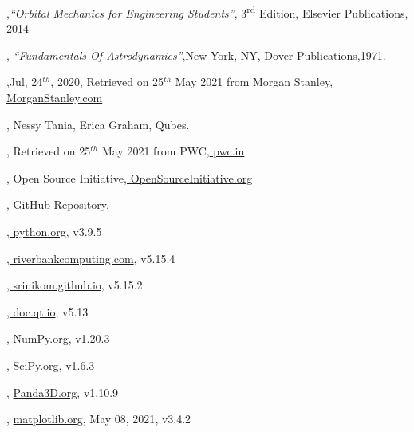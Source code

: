 \documentclass[12pt]{article}
\begin{document}
\begin{thebibliography}{99}
	,{\textit{\enquote{Orbital Mechanics for Engineering Students}}},{ 3\textsuperscript{rd} Edition}, { Elsevier Publications},{ 2014}	
	
	,{ \textit{\enquote{Fundamentals Of Astrodynamics}}},{New York, NY},{ Dover Publications},{1971}.
	
	,{Jul, 24$^{th}$, 2020}, { Retrieved on 25$^{th}$ May 2021 from Morgan Stanley},{\href{https://www.morganstanley.com/ideas/investing-in-space}{ MorganStanley.com}}
	
	,{ Nessy Tania, Erica Graham}, {Qubes.}
	
	,{ Retrieved on 25$^{th}$ May 2021 from PWC},{\href{https://www.pwc.in/research-insights/2020/preparing-to-scale-new-heights.html}{ pwc.in}}
	
	,{ Open Source Initiative},{\href{https://opensource.org/licenses/gpl-3.0.html}{ OpenSourceInitiative.org}}

	, {\href{https://github.com/iamlrk/MOPy}{GitHub Repository}}.
	
	,{\href{https://docs.python.org}{ python.org}},{ v3.9.5}
	
	,{\href{https://www.riverbankcomputing.com/static/Docs/PyQt5/}{ riverbankcomputing.com}},{ v5.15.4}
	
	,{\href{https://srinikom.github.io/pyside-docs/pysideapi2.html}{ srinikom.github.io}},{ v5.15.2}
	
	,{\href{https://doc.qt.io/qt-5/qtdesigner-manual.html}{ doc.qt.io}},{ v5.13}
	
	, {\href{https://numpy.org/doc}{ NumPy.org}},{ v1.20.3}
	
	, {\href{https://scipy.org/doc}{ SciPy.org}},{ v1.6.3}
	
	, {\href{https://docs.panda3d.org/1.10/python/index}{ Panda3D.org}},{ v1.10.9}
	
	, {\href{https://matplotlib.org/stable/contents.html}{ matplotlib.org}}, {May 08, 2021}, { v3.4.2}
	
\end{thebibliography}
\end{document}
